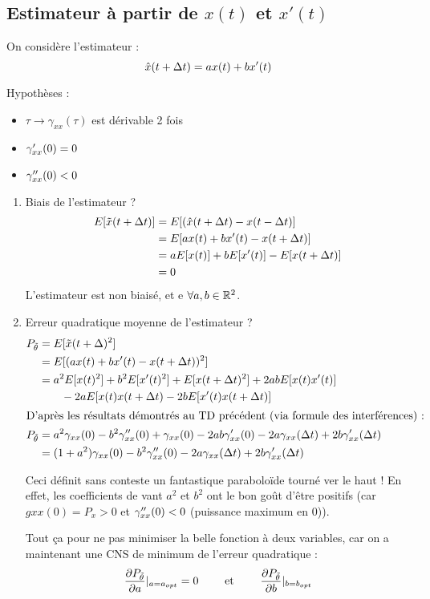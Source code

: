 \documentclass[main.tex]{subfiles}
\begin{document}
\subsection{Estimateur à partir de $x(t)$ et $x'(t)$}

On considère l'estimateur :
\[ \hat{x}(t+\Delta t) = ax(t) + bx'(t) \]

Hypothèses :
\begin{itemize}
\item $\tau \rightarrow \gamma_{xx}(\tau)$ est dérivable 2 fois
\item $\gamma_{xx}'(0)=0$
\item $\gamma_{xx}''(0) <0$
\end{itemize}

\begin{enumerate}\setlength{\itemsep}{5mm}
\item Biais de l'estimateur ? 
\begin{align*}
E[\tilde{x}(t+\Delta t)] & = E[(\hat{x}(t+\Delta t) - x(t-\Delta t)] \\
& = E[ax(t) + bx'(t) - x(t+\Delta t)]\\
& = a E[x(t)] + bE[x'(t)] - E[x(t+\Delta t)] \\
& = 0
\end{align*}
L'estimateur est non biaisé, et e $\forall a,b\in\mathbb{R}^2$.

\item Erreur quadratique moyenne de l'estimateur ?
\begin{align*}
P_{\tilde{\theta}} &= E[\tilde{x}(t+\Delta)^2] \\
& = E[(ax(t)+bx'(t)-x(t+\Delta t))^2] \\
& = a^2E[x(t)^2] + b^2E[x'(t)^2]+E[x(t+\Delta t)^2] + 2abE[x(t)x'(t)] \\& \qquad -  2aE[x(t)x(t+\Delta t) - 2bE[x'(t)x(t+\Delta t)] \\
\intertext{D'après les résultats démontrés au TD précédent (via formule des interférences) : }
P_{\tilde{\theta}} & = a^2\gamma_{xx}(0) -b^2\gamma_{xx}''(0)+\gamma_{xx}(0) -2ab\gamma_{xx}'(0)-2a\gamma_{xx}(\Delta t) +2b\gamma_{xx}'(\Delta t) \\
& = (1+a^2)\gamma_{xx}(0) -b^2\gamma_{xx}''(0) -2a\gamma_{xx}(\Delta t) +2b\gamma_{xx}'(\Delta t) 
\end{align*}

Ceci définit sans conteste un fantastique paraboloïde tourné ver le haut ! En effet, les coefficients de vant $a^2$ et $b^2$ ont le bon goût d'être positifs (car $gxx(0)=P_x>0$ et $\gamma_{xx}''(0)<0$ (puissance maximum en 0)).

Tout ça pour ne pas minimiser la belle fonction à deux variables, car on a maintenant une CNS de minimum de l'erreur quadratique :
\[ \frac{\partial P_{\tilde{\theta}}}{\partial a}|_{a=a_{opt}} = 0 \quad \quad\text{ et }\quad \quad \frac{\partial P_{\tilde{\theta}}}{\partial b}|_{b=b_{opt}} \]


\end{enumerate}
\end{document}
